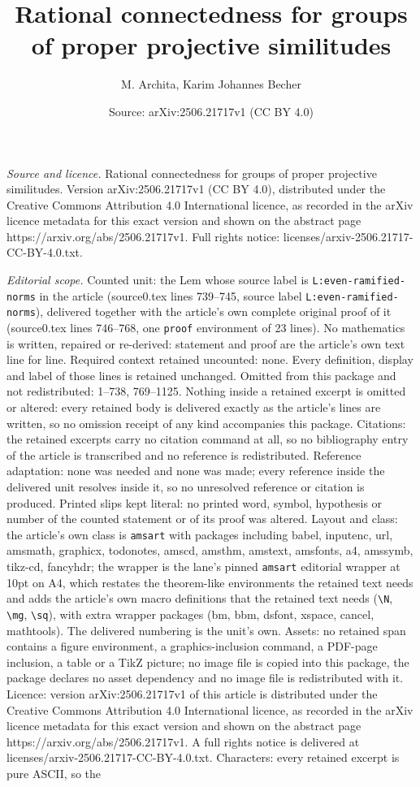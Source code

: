 \documentclass[10pt,a4paper]{amsart}
\title[Rational connectedness for groups of proper projective simil]{Rational connectedness for groups of proper projective similitudes}
\author{M. Archita, Karim Johannes Becher}
\date{Source: arXiv:2506.21717v1 (CC BY 4.0)}
\begin{document}
\maketitle

\noindent\emph{Source and licence.} Rational connectedness for groups of proper projective similitudes. Version arXiv:2506.21717v1 (CC BY 4.0), distributed under the Creative Commons Attribution 4.0 International licence, as recorded in the arXiv licence metadata for this exact version and shown on the abstract page https://arxiv.org/abs/2506.21717v1. Full rights notice: licenses/arxiv-2506.21717-CC-BY-4.0.txt.\par\smallskip

\noindent\textit{Editorial scope.} Counted unit: the Lem whose source label is \texttt{L:even-ramified-norms} in the article (source0.tex lines 739--745, source label \texttt{L:even-ramified-norms}), delivered together with the article's own complete original proof of it (source0.tex lines 746--768, one \texttt{proof} environment of 23 lines). No mathematics is written, repaired or re-derived: statement and proof are the article's own text line for line. Required context retained uncounted: none. Every definition, display and label of those lines is retained unchanged. Omitted from this package and not redistributed: 1--738, 769--1125. Nothing inside a retained excerpt is omitted or altered: every retained body is delivered exactly as the article's lines are written, so no omission receipt of any kind accompanies this package. Citations: the retained excerpts carry no citation command at all, so no bibliography entry of the article is transcribed and no reference is redistributed. Reference adaptation: none was needed and none was made; every reference inside the delivered unit resolves inside it, so no unresolved reference or citation is produced. Printed slips kept literal: no printed word, symbol, hypothesis or number of the counted statement or of its proof was altered. Layout and class: the article's own class is \texttt{amsart} with packages including babel, inputenc, url, amsmath, graphicx, todonotes, amscd, amsthm, amstext, amsfonts, a4, amssymb, tikz-cd, fancyhdr; the wrapper is the lane's pinned \texttt{amsart} editorial wrapper at 10pt on A4, which restates the theorem-like environments the retained text needs and adds the article's own macro definitions that the retained text needs (\texttt{\textbackslash N}, \texttt{\textbackslash mg}, \texttt{\textbackslash sq}), with extra wrapper packages (bm, bbm, dsfont, xspace, cancel, mathtools). The delivered numbering is the unit's own. Assets: no retained span contains a figure environment, a graphics-inclusion command, a PDF-page inclusion, a table or a TikZ picture; no image file is copied into this package, the package declares no asset dependency and no image file is redistributed with it. Licence: version arXiv:2506.21717v1 of this article is distributed under the Creative Commons Attribution 4.0 International licence, as recorded in the arXiv licence metadata for this exact version and shown on the abstract page https://arxiv.org/abs/2506.21717v1. A full rights notice is delivered at licenses/arxiv-2506.21717-CC-BY-4.0.txt. Characters: every retained excerpt is pure ASCII, so the 
\end{document}
